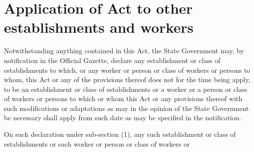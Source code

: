 \documentclass[gaz8]{mhact}
\begin{document}
\section{Application of Act to other establishments and workers }
\begin{subsectionlist}
\item Notwithstanding anything contained in this Act, the State
Government may, by notification in the Official Gazette, declare any
establishment or class of establishments to which, or any worker or person
or class of workers or persons to whom, this Act or any of the provisions
thereof does not for the time being apply, to be an establishment or class of
establishments or a worker or a person or class of workers or persons to
which or whom this Act or any provisions thereof with such modifications or
adaptations as may in the opinion of the State Government be necessary
shall apply from such date as may be specified in the notification.
\item On such declaration under sub-section (1), any such establishment
or class of establishments or such worker or person or class of workers or

\end{subsectionlist}





\end{document}
